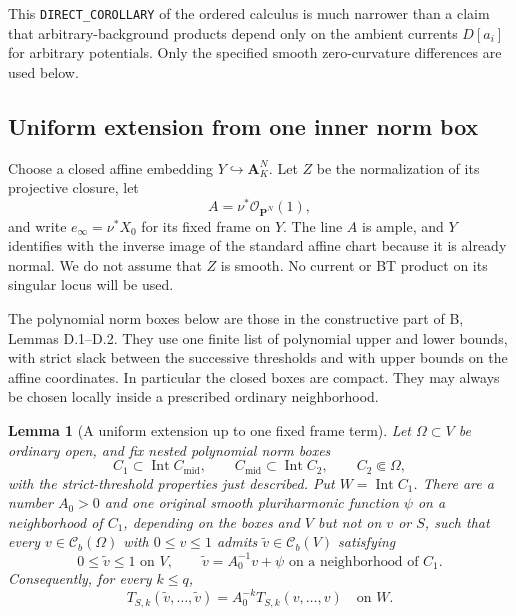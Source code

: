 \documentclass[11pt,a4paper]{article}
\numberwithin{equation}{section}
\newtheorem{lemma}[theorem]{Lemma}
\theoremstyle{definition}
\theoremstyle{remark}
\newcommand{\Cb}{\mathcal C_b}
\begin{document}
This \texttt{DIRECT\_COROLLARY} of the ordered calculus is much
narrower than a claim that arbitrary-background products depend only
on the ambient currents $D[a_i]$ for arbitrary potentials. Only the
specified smooth zero-curvature differences are used below.

\subsection{Uniform extension from one inner norm box}

Choose a closed affine embedding $Y\hookrightarrow\mathbf A^N_K$.
Let $Z$ be the normalization of its projective closure, let
\[
 A=\nu^*\mathcal O_{\mathbf P^N}(1),
\]
and write $e_\infty=\nu^*X_0$ for its fixed frame on $Y$. The line
$A$ is ample, and $Y$ identifies with the inverse image of the
standard affine chart because it is already normal. We do not assume
that $Z$ is smooth. No current or BT product on its singular locus
will be used.

The polynomial norm boxes below are those in the constructive part of
\textup{B}, Lemmas D.1--D.2. They use one finite list of polynomial
upper and lower bounds, with strict slack between the successive
thresholds and with upper bounds on the affine coordinates. In
particular the closed boxes are compact. They may always be chosen
locally inside a prescribed ordinary neighborhood.

\begin{lemma}[A uniform extension up to one fixed frame term]
\label{lem:r2-uniform-framed-extension}
Let $\Omega\subset V$ be ordinary open, and fix nested polynomial
norm boxes
\[
 C_1\subset\operatorname{Int}C_{\mathrm{mid}},\qquad
 C_{\mathrm{mid}}\subset\operatorname{Int}C_2,\qquad
 C_2\Subset\Omega,
\]
with the strict-threshold properties just described. Put
$W=\operatorname{Int}C_1$. There are a number $A_0>0$ and one
original smooth pluriharmonic function $\psi$ on a neighborhood of
$C_1$, depending on the boxes and $V$ but not on $v$ or $S$, such
that every $v\in\Cb(\Omega)$ with $0\leq v\leq1$ admits
$\widetilde v\in\Cb(V)$ satisfying
\[
 0\leq\widetilde v\leq1\text{ on }V,
 \qquad
 \widetilde v=A_0^{-1}v+\psi\text{ on a neighborhood of }C_1.
 \tag{E}\label{eq:r2-uniform-framed-extension}
\]
Consequently, for every $k\leq q$,
\[
 T_{S,k}(\widetilde v,\ldots,\widetilde v)
       =A_0^{-k}T_{S,k}(v,\ldots,v)\quad\text{on }W.
 \tag{P}\label{eq:r2-extension-product}
\]
\end{lemma}
\end{document}
